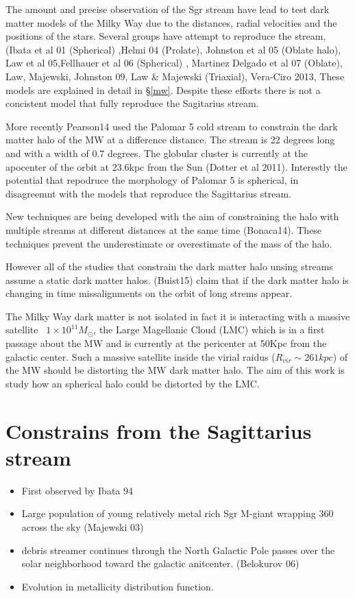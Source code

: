 \documentclass[12pt]{article}
\begin{document}
The amount and precise observation of the Sgr stream have lead to test dark matter models of
the Milky Way due to the distances, radial velocities and the positions of
the stars. Several groups have attempt to reproduce the stream, (Ibata et al 01 (Spherical)
,Helmi 04 (Prolate), Johnston et al 05 (Oblate halo), Law et al 05,Fellhauer et al 06 (Spherical)
, Martinez Delgado et al 07 (Oblate), Law, Majewski, Johnston 09, Law \& Majewski (Triaxial),
Vera-Ciro 2013, These models are explained in detail in \S \ref{mw}. Despite these efforts
there is not a concistent model that fully reproduce the Sagitarius stream.

More recently Pearson14 used the Palomar 5 cold stream to constrain the dark 
matter halo of the MW at a difference distance. The stream is 22 degrees
long and with a width of 0.7 degrees. The globular cluster is currently at the 
apocenter of the orbit at 23.6kpc from the Sun (Dotter et al 2011). Interestly 
the potential that repodruce the morphology of Palomar 5 is spherical, in 
disagreemnt with the models that reproduce the Sagittarius stream. 

New techniques are being developed with the aim of constraining the halo with multiple
streams at different distances at the same time (Bonaca14). These techniques 
prevent the underestimate or overestimate of the mass of the halo. 

However all of the studies that constrain the dark matter halo unsing streams
assume a static dark matter halos. (Buist15) claim that if the dark matter
halo is changing in time missalignments on the orbit of long strems appear.       

The Milky Way dark matter is not isolated in fact it is interacting with a 
massive satellite ~$1\times10^{11}M_{\odot}$, the Large Magellanic Cloud (LMC)
which is in a first passage about the MW and is currently at the pericenter
at 50Kpc from the galactic center. Such a massive satellite inside the virial 
raidus ($R_{vir}\sim 261kpc$) of the MW should be distorting the MW dark matter
halo. The aim of this work is study how an spherical halo could be distorted
by the LMC. 
  

\section{Constrains from the Sagittarius stream}

\begin{itemize}
\item First observed by Ibata 94
\item Large population of young relatively metal rich Sgr M-giant wrapping 360
across the sky  (Majewski 03)
\item debris streamer continues through the North Galactic Pole passes over the 
solar neighborhood toward the galactic anitcenter. (Belokurov 06)
\item Evolution in metallicity distribution function.
\end{itemize}
\end{document}
